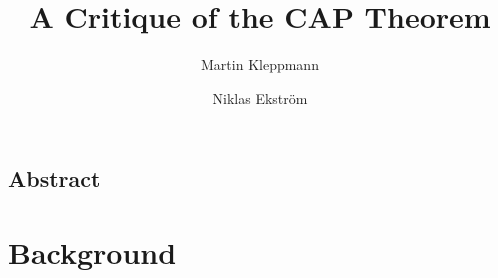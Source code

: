 \documentclass[a4paper,twocolumn,10pt]{article}
\begin{document}
\sloppy
\date{} %
\title{A Critique of the CAP Theorem}
\author{Martin Kleppmann \and Niklas Ekstr{\"o}m}
\maketitle

\subsection*{Abstract}

\section{Background}

\cite{Fox1999bs, Brewer2012tr, Gilbert2012bf, Brewer2012ba, Gilbert2002il, Brewer2000vd}
\cite{Abadi2012hb}
\cite{Lynch1989kj}
\cite{Attiya1994gw}
\cite{Attiya1995bm}
\cite{Fischer1985tt}
\cite{Darcy2010ta}
\cite{Robinson2010tp}
\cite{Johnson1975we, Lindsay1979wv, Davidson1985hv}
\cite{Mahajan2011wz}
\cite{Sewell2010fj}


{}
\end{document}
